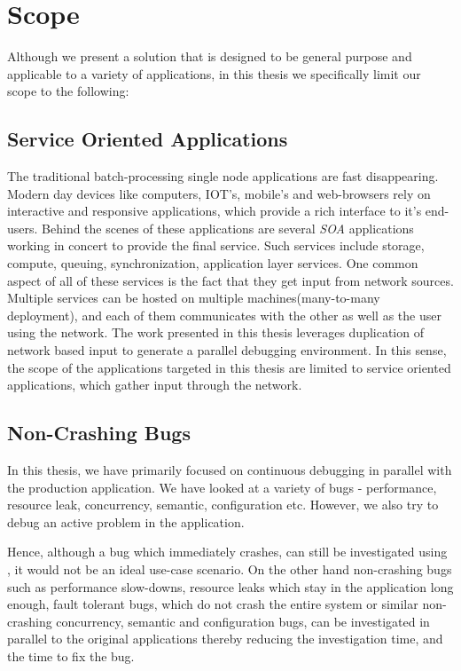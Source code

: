 \section{Scope}
\label{sec:introScope}

Although we present a solution that is designed to be general purpose and applicable to a variety of applications, in this thesis we specifically limit our scope to the following:

\subsection{Service Oriented Applications}
\label{sec:introScopeSOA}

The traditional batch-processing single node applications are fast disappearing.
Modern day devices like computers, IOT's, mobile's and web-browsers rely on interactive and responsive applications, which provide a rich interface to it's end-users.
Behind the scenes of these applications are several \emph{SOA} applications working in concert to provide the final service. 
Such services include storage, compute, queuing, synchronization, application layer services.
One common aspect of all of these services is the fact that they get input from network sources.
Multiple services can be hosted on multiple machines(many-to-many deployment), and each of them communicates with the other as well as the user using the network.
The work presented in this thesis leverages duplication of network based input to generate a parallel debugging environment.
In this sense, the scope of the applications targeted in this thesis are limited to service oriented applications, which gather input through the network.

\subsection{Non-Crashing Bugs}
\label{sec:introScopeNonCrash}

In this thesis, we have primarily focused on continuous debugging in parallel with the production application.
We have looked at a variety of bugs - performance, resource leak, concurrency, semantic, configuration etc.
However, we also try to debug an active problem in the application. 

Hence, although a bug which immediately crashes, can still be investigated using \parikshan, it would not be an ideal use-case scenario.
On the other hand non-crashing bugs such as performance slow-downs, resource leaks which stay in the application long enough, fault tolerant bugs, which do not crash the entire system or similar non-crashing concurrency, semantic and configuration bugs, can be investigated in parallel to the original applications thereby reducing the investigation time, and the time to fix the bug.

